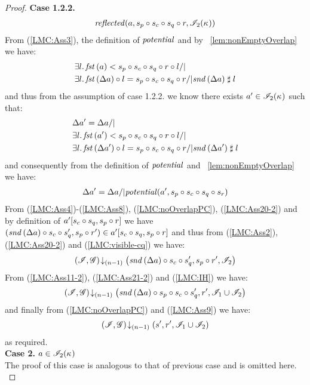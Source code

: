 \begin{lemma}
\begin{proof}
\noindent\textbf{Case 1.2.2.}
\[
\begin{array}{l l}
	\mathit{reflected}(a, s_p \circ s_c \circ s_q \circ r, \mathscr{I}_{2}(\kappa_{})) 
\end{array}
\]
From (\ref{LMC:Ass3}), the definition of $\mathit{potential}$ and by \lem~\ref{lem:nonEmptyOverlap} we have:
%
\begin{align*}
	& \exsts{l} \fst{a} < s_p \composeL s_c \composeL s_q \composeL r \composeL l /| \null\\
	& \exsts{l} \fst{\updateFP{a}} \composeL l = s_p \composeL s_c \composeL s_q \composeL r /| \snd{\updateFP{a}} \compatible l
\end{align*}
%
and thus from the assumption of case 1.2.2. we know there exists $a' \in \mathscr{I}_2(\kappa_{})$ such that: 
%
\begin{align*}
	& \updateFP{a'} = \updateFP{a} /|\\
	& \exsts{l} \fst{a'} < s_p \composeL s_c \composeL s_q \composeL r \composeL l /| \null\\
	& \exsts{l} \fst{\updateFP{a'}} \composeL l = s_p \composeL s_c \composeL s_q \composeL r /| \snd{\updateFP{a'}} \compatible l
\end{align*}
%
and consequently from the definition of $\mathit{potential}$ and \lem~\ref{lem:nonEmptyOverlap} we have: 
%
\begin{align}
	\Delta {a'} = \Delta {a} /| \mathit{potential}(a', s_p \circ s_c \circ s_q \circ s_r) \label{LMC:Ass20-2}
\end{align}
From (\ref{LMC:Ass4})-(\ref{LMC:Ass8}), (\ref{LMC:noOverlapPC}), (\ref{LMC:Ass20-2}) and by definition of $a'[s_c \circ s_q, s_p \circ r]$ we have $(\mathit{snd}\left(\Delta {a}\right) \circ s_c \circ s_q', s_p \circ r') \in a'[s_c \circ s_q, s_p \circ r]$ and thus from (\ref{LMC:Ass2}), (\ref{LMC:Ass20-2}) and (\ref{LMC:visible-cq}) we have:
%
\begin{align}
	\left(\mathscr{I}, \mathscr{G}\right) \!\downarrow_{(n-1)} \left(\mathit{snd}\left(\Delta {a}\right) \circ s_c \circ s_q', s_p \circ r', \mathscr{I}_2\right) \label{LMC:Ass21-2}
\end{align}
From (\ref{LMC:Ass11-2}), (\ref{LMC:Ass21-2}) and (\ref{LMC:IH}) we have: 
%
\begin{align*}
	\left(\mathscr{I}, \mathscr{G}\right) \!\downarrow_{(n-1)} \left(\mathit{snd}\left(\Delta {a}\right) \circ s_p \circ s_c \circ s_q', r', \mathscr{I}_1 \cup \mathscr{I}_2\right) 
\end{align*}
and finally from (\ref{LMC:noOverlapPC}) and (\ref{LMC:Ass9}) we have: 
%
\begin{align*}
	\left(\mathscr{I}, \mathscr{G}\right) \!\downarrow_{(n-1)} \left(s', r', \mathscr{I}_1 \cup \mathscr{I}_2\right) 
\end{align*}
as required.\\
%
%
%
%
\noindent\textbf{Case 2.} $a \in \mathscr{I}_{2}(\kappa_{})$\\
The proof of this case is analogous to that of previous case and is omitted here.\\
%
%
%
%
%









\end{proof}
\end{lemma}
